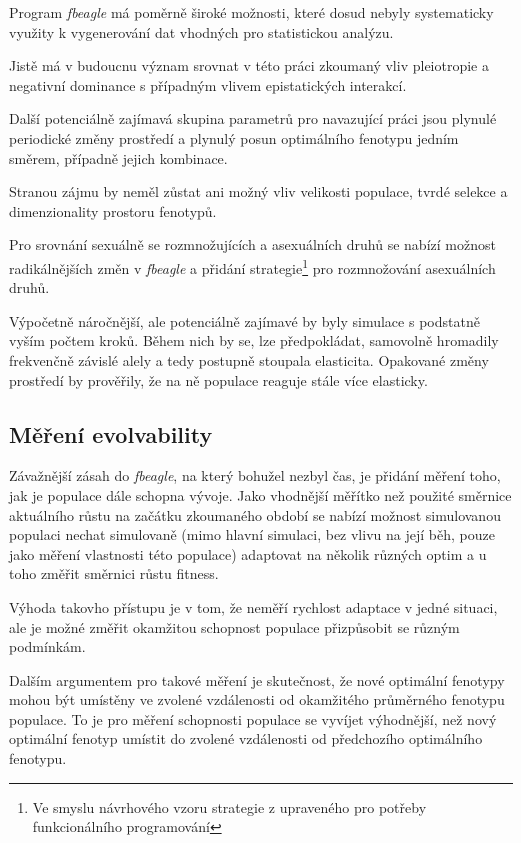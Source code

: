 Program \textit{fbeagle} má poměrně široké možnosti, které dosud nebyly systematicky využity k
vygenerování dat vhodných pro statistickou analýzu.

Jistě má v budoucnu význam srovnat v této práci zkoumaný vliv pleiotropie a negativní dominance s případným vlivem
epistatických interakcí.

Další potenciálně zajímavá skupina parametrů pro navazující práci jsou plynulé periodické změny prostředí
a plynulý posun optimálního fenotypu jedním směrem, případně jejich kombinace.

Stranou zájmu by neměl zůstat ani možný vliv velikosti populace, tvrdé selekce a dimenzionality prostoru fenotypů.

Pro srovnání sexuálně se rozmnožujících a asexuálních druhů se nabízí možnost radikálnějších změn v \textit{fbeagle}
a přidání strategie\footnote{Ve smyslu návrhového vzoru strategie z \citet{GammaHelmEtAl95} upraveného pro potřeby
funkcionálního programování} pro rozmnožování asexuálních druhů.

Výpočetně náročnější, ale potenciálně zajímavé by byly simulace s podstatně vyším počtem kroků. Během nich by se, lze
předpokládat, samovolně hromadily frekvenčně závislé alely a tedy postupně stoupala elasticita.
Opakované změny prostředí by prověřily, že na ně populace reaguje stále více elasticky.

\subsection{Měření evolvability}

Závažnější zásah do \textit{fbeagle}, na který bohužel nezbyl čas, je přidání měření toho, jak je populace
dále schopna vývoje. Jako vhodnější měřítko než použité směrnice aktuálního růstu na začátku zkoumaného období
se nabízí možnost simulovanou populaci nechat simulovaně (mimo hlavní simulaci, bez vlivu na její běh,
pouze jako měření vlastnosti této populace) adaptovat na několik různých optim a u toho změřit směrnici
růstu fitness.

Výhoda takovho přístupu je v tom, že neměří rychlost adaptace v jedné situaci, ale je možné změřit okamžitou schopnost
populace přizpůsobit se různým podmínkám.

Dalším argumentem pro takové měření je skutečnost, že nové optimální fenotypy mohou být umístěny ve zvolené vzdálenosti
od okamžitého průměrného fenotypu populace. To je pro měření schopnosti populace se vyvíjet výhodnější, než nový
optimální fenotyp umístit do zvolené vzdálenosti od předchozího optimálního fenotypu.
